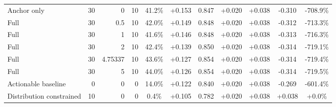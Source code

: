 \begin{table}[htbp]
\begin{tabular}{lrrrccccccc}
Anchor only & 30 & 0 & 10 & 41.2\% & +0.153 & 0.847 & +0.020 & +0.038 & -0.310 & -708.9\% \\
Full & 30 & 0.5 & 10 & 42.0\% & +0.149 & 0.848 & +0.020 & +0.038 & -0.312 & -713.3\% \\
Full & 30 & 1 & 10 & 41.6\% & +0.146 & 0.848 & +0.020 & +0.038 & -0.313 & -716.3\% \\
Full & 30 & 2 & 10 & 42.4\% & +0.139 & 0.850 & +0.020 & +0.038 & -0.314 & -719.1\% \\
Full & 30 & 4.75337 & 10 & 43.6\% & +0.127 & 0.854 & +0.020 & +0.038 & -0.314 & -719.4\% \\
Full & 30 & 5 & 10 & 44.0\% & +0.126 & 0.854 & +0.020 & +0.038 & -0.314 & -719.5\% \\
Actionable baseline & 0 & 0 & 0 & 14.0\% & +0.122 & 0.840 & +0.020 & +0.038 & -0.269 & -601.4\% \\
Distribution constrained & 10 & 0 & 0 & 0.4\% & +0.105 & 0.782 & +0.020 & +0.038 & +0.038 & +0.0\% \\
\bottomrule
\end{tabular}
\end{table}
